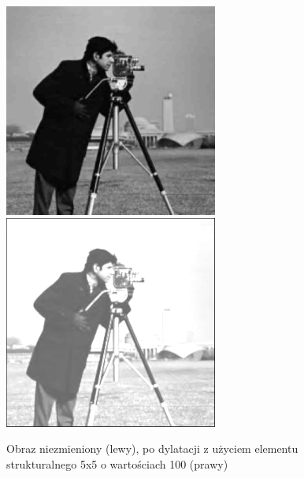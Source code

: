 \documentclass[a4paper,12pt]{book}
\begin{document}
\begin{figure}[H]
	\caption{Obraz niezmieniony (lewy), po dylatacji z użyciem elementu strukturalnego 5x5 o wartościach 100 (prawy)}
	\includegraphics[width=7cm, height=7cm]{man-unmodified.jpg}
	\includegraphics[width=7cm, height=7cm]{morph-gray-dilation-strel5x5-100.png}
\end{figure}
\end{document}
